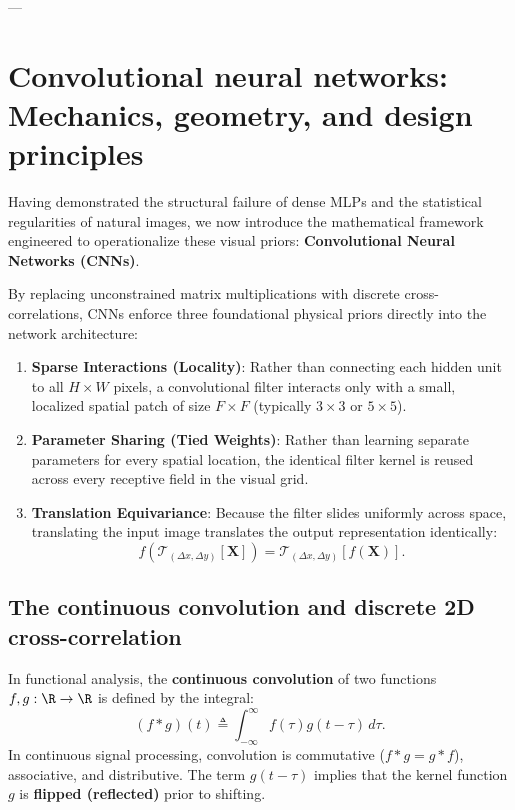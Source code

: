 ---

\section{Convolutional neural networks: Mechanics, geometry, and design principles}
\label{sec:cnn_mechanics_and_geometry}

Having demonstrated the structural failure of dense MLPs and the statistical regularities of natural images, we now introduce the mathematical framework engineered to operationalize these visual priors: \textbf{Convolutional Neural Networks (CNNs)}.

By replacing unconstrained matrix multiplications with discrete cross-correlations, CNNs enforce three foundational physical priors directly into the network architecture:
\begin{enumerate}
  \item \textbf{Sparse Interactions (Locality)}: Rather than connecting each hidden unit to all $H \times W$ pixels, a convolutional filter interacts only with a small, localized spatial patch of size $F \times F$ (typically $3 \times 3$ or $5 \times 5$).
  \item \textbf{Parameter Sharing (Tied Weights)}: Rather than learning separate parameters for every spatial location, the identical filter kernel is reused across every receptive field in the visual grid.
  \item \textbf{Translation Equivariance}: Because the filter slides uniformly across space, translating the input image translates the output representation identically:
    \begin{equation}
    f\left( \mathcal{T}_{(\Delta x, \Delta y)}[\mathbf{X}] \right) = \mathcal{T}_{(\Delta x, \Delta y)}[f(\mathbf{X})].
    \label{eq:equivariance_def}
    \end{equation}
\end{enumerate}

\subsection{The continuous convolution and discrete 2D cross-correlation}
\label{sec:convolution_mathematical_definition}

In functional analysis, the \textbf{continuous convolution} of two functions $f, g: \R \to \R$ is defined by the integral:
\begin{equation}
(f * g)(t) \triangleq \int_{-\infty}^{\infty} f(\tau) g(t - \tau) \, d\tau.
\label{eq:continuous_convolution}
\end{equation}
In continuous signal processing, convolution is commutative ($f * g = g * f$), associative, and distributive. The term $g(t - \tau)$ implies that the kernel function $g$ is \textbf{flipped (reflected)} prior to shifting.

